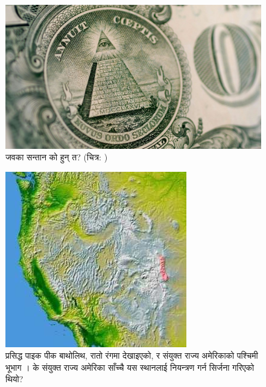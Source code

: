 \documentclass[10pt,twocolumn,letterpaper]{article}
\begin{document}
\begin{figure}[t]
\begin{center}
   \includegraphics[width=1\linewidth]{illuminati.jpg}
\end{center}
   \caption{जवका सन्तान को हुन् त? (चित्र: \cite{35})}
\label{fig:10}
\label{fig:onecol}
\end{figure}

\begin{figure}[t]
\begin{center}
   \includegraphics[width=1\linewidth]{pike.jpg}
\end{center}
   \caption{प्रसिद्ध पाइक पीक बाथोलिथ, रातो रंगमा देखाइएको, र संयुक्त राज्य अमेरिकाको पश्चिमी भूभाग \cite{36}। के संयुक्त राज्य अमेरिका साँच्चै यस स्थानलाई नियन्त्रण गर्न सिर्जना गरिएको थियो?}
\label{fig:11}
\label{fig:onecol}
\end{figure}
\end{document}
